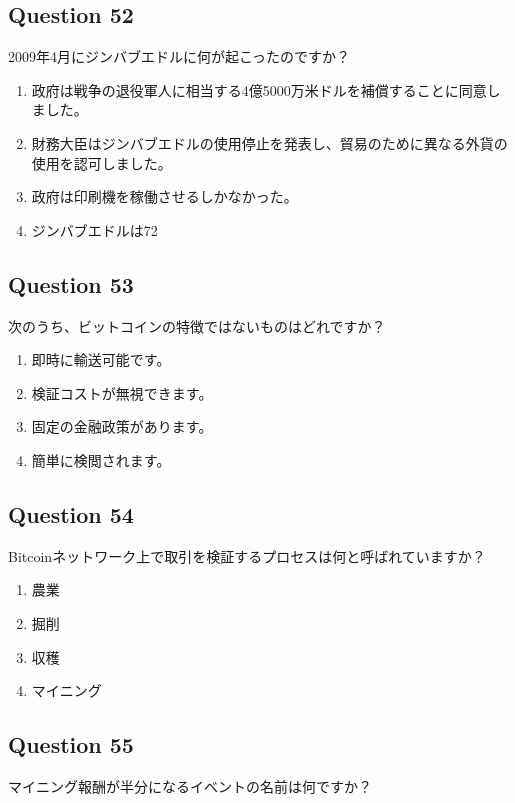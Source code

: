 \documentclass[12pt,a4paper]{article}
\begin{document}
\bigskip


\subsection*{Question 52}
2009年4月にジンバブエドルに何が起こったのですか？

\begin{enumerate}[label=\Alph*., leftmargin=*]
\item 政府は戦争の退役軍人に相当する4億5000万米ドルを補償することに同意しました。
\item 財務大臣はジンバブエドルの使用停止を発表し、貿易のために異なる外貨の使用を認可しました。
\item 政府は印刷機を稼働させるしかなかった。
\item ジンバブエドルは72%
\end{enumerate}

\bigskip


\subsection*{Question 53}
次のうち、ビットコインの特徴ではないものはどれですか？

\begin{enumerate}[label=\Alph*., leftmargin=*]
\item 即時に輸送可能です。
\item 検証コストが無視できます。
\item 固定の金融政策があります。
\item 簡単に検閲されます。
\end{enumerate}

\bigskip


\subsection*{Question 54}
Bitcoinネットワーク上で取引を検証するプロセスは何と呼ばれていますか？

\begin{enumerate}[label=\Alph*., leftmargin=*]
\item 農業
\item 掘削
\item 収穫
\item マイニング
\end{enumerate}

\bigskip


\subsection*{Question 55}
マイニング報酬が半分になるイベントの名前は何ですか？
\end{document}
